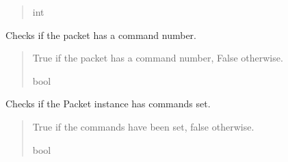 \documentclass[letterpaper,10pt,english]{sphinxmanual}
\begin{document}
\begin{fulllineitems}
\begin{fulllineitems}
\begin{quote}
\begin{description}
\sphinxAtStartPar
int

\end{description}\end{quote}

\end{fulllineitems}


\begin{fulllineitems}
\label{\detokenize{PodApi.Packets:PodApi.Packets.Packet.Packet.HasCommandNumber}}
\pysigstartsignatures
{}
\pysigstopsignatures
\sphinxAtStartPar
Checks if the packet has a command number.
\begin{quote}\begin{description}
\sphinxAtStartPar
True if the packet has a command number, False otherwise.

\sphinxAtStartPar
bool

\end{description}\end{quote}

\end{fulllineitems}


\begin{fulllineitems}
\label{\detokenize{PodApi.Packets:PodApi.Packets.Packet.Packet.HasCommands}}
\pysigstartsignatures
{}
\pysigstopsignatures
\sphinxAtStartPar
Checks if the Packet instance has commands set.
\begin{quote}\begin{description}
\sphinxAtStartPar
True if the commands have been set, false otherwise.

\sphinxAtStartPar
bool

\end{description}\end{quote}

\end{fulllineitems}


\end{fulllineitems}
\end{document}
